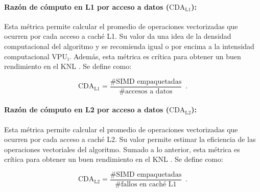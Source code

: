 \paragraph*{Raz\'on de c\'omputo en L1 por acceso a datos ($\text{CDA}_\text{L1}$):}

Esta m\'etrica permite calcular el promedio de operaciones vectorizadas que ocurren por cada acceso a cach\'e L1. Su valor da una idea de la densidad computacional del algoritmo y se recomienda igual o por encima a la intensidad computacional $\text{VPU}_{\text{i}}$. Adem\'as, esta m\'etrica es cr\'itica para obtener un buen rendimiento en el KNL \cite{Jeffers2016315}. Se define como:

\begin{equation}
\text{CDA}_\text{L1} = \frac{\text{\# SIMD empaquetadas}}{\text{\# accesos a datos}} \enspace .
\end{equation}



\paragraph*{Raz\'on de c\'omputo en L2 por acceso a datos ($\text{CDA}_\text{L2}$):}

Esta m\'etrica permite calcular el promedio de operaciones vectorizadas que ocurren por cada acceso a cach\'e L2. Su valor permite estimar la eficiencia de las operaciones vectoriales del algoritmo. Sumado a lo anterior, esta m\'etrica es cr\'itica para obtener un buen rendimiento en el KNL \cite{Jeffers2016315}. Se define como:

\begin{equation}
\text{CDA}_{\text{L2}} = \frac{\text{\# SIMD empaquetadas}}{\text{\# fallos en cach\'e L1}} \enspace .
\end{equation}



